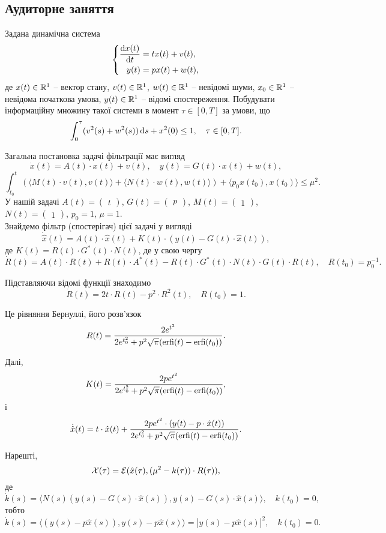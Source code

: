 \subsection{Аудиторне заняття}

\begin{problem}
	Задана динамічна система \[ \left\{ \begin{aligned}
		\frac{\mathop{}\!\mathrm{d} x(t)}{\mathop{}\!\mathrm{d} t} &= t x(t) + v(t), \\
		y(t) &= p x(t) + w(t),
	\end{aligned} \right. \]
	де $x(t) \in \mathbb{R}^1$ -- вектор стану, $v(t) \in \mathbb{R}^1$, $w(t) \in \mathbb{R}^1$ -- невідомі шуми, $x_0 \in \mathbb{R}^1$ -- невідома початкова умова, $y(t) \in \mathbb{R}^1$ -- відомі спостереження. Побудувати інформаційну множину такої системи в момент $\tau \in [0, T]$ за умови, що \[ \int_0^\tau (v^2(s) + w^2(s)) \mathop{}\!\mathrm{d} s + x^2(0) \le 1, \quad \tau \in [0, T]. \]
\end{problem}

\begin{solution}
	Загальна постановка задачі фільтрації має вигляд \[ \dot x (t)= A (t) \cdot x (t)+ v (t), \quad y (t)= G (t) \cdot x(t) + w(t),\] \[\int_{t_0}^t ( \langle M(t) \cdot v(t), v(t)\rangle + \langle N(t) \cdot w(t), w(t)\rangle )  + \langle p_0 x(t_0), x(t_0) \rangle \le \mu^2. \] У нашій задачі $A (t)= \begin{pmatrix} t \end{pmatrix}$, $G (t)= \begin{pmatrix} p \end{pmatrix}$, $M (t)= \begin{pmatrix} 1 \end{pmatrix}$, $N (t)= \begin{pmatrix} 1 \end{pmatrix}$, $p_0 = 1$, $\mu = 1$. \\

	Знайдемо фільтр (спостерігач) цієї задачі у вигляді \[ \dot{\hat{x}} (t) = A (t) \cdot \hat x (t) + K (t) \cdot (y (t) - G (t) \cdot \hat x (t)), \] де $K (t)= R (t) \cdot G^* (t) \cdot N(t)$, де у свою чергу \[\dot R (t)= A (t) \cdot R (t)+ R (t) \cdot A^* (t)- R (t) \cdot G^* (t) \cdot N (t) \cdot G (t) \cdot R(t), \quad R(t_0) = p_0^{-1}. \]

 	Підставляючи відомі функції знаходимо \[\dot R (t)= 2 t \cdot R (t) - p^2 \cdot R^2(t), \quad R(t_0) = 1. \]

 	Це рівняння Бернуллі, його розв'язок \[ R(t) = \frac{2 e^{t^2}}{2 e^{t_0^2} + p^2 \sqrt{\pi} (\operatorname{erfi}(t) - \operatorname{erfi}(t_0))}. \]

 	Далі, \[ K(t) = \frac{2 p e^{t^2}}{2 e^{t_0^2} + p^2 \sqrt{\pi} (\operatorname{erfi}(t) - \operatorname{erfi}(t_0))}, \] і \[ \dot{\hat{x}} (t) = t \cdot \hat x (t) + \frac{2 p e^{t^2} \cdot (y (t) - p \cdot \hat x (t))}{2 e^{t_0^2} + p^2 \sqrt{\pi} (\operatorname{erfi}(t) - \operatorname{erfi}(t_0))}. \]

 	Нарешті, \[ \mathcal{X}(\tau) = \mathcal{E} (\hat x(\tau), (\mu^2 - k(\tau)) \cdot R(\tau)), \] де \[ \dot k (s) = \langle N(s) (y(s) - G(s) \cdot \hat x(s)), y(s) - G(s) \cdot \hat x(s)\rangle, \quad k(t_0) = 0, \] тобто \[ \dot k (s) = \langle (y(s) - p \hat x(s)), y(s) - p \hat x(s)\rangle = |y(s) - p \hat x(s)|^2, \quad k(t_0) = 0. \]
\end{solution}

